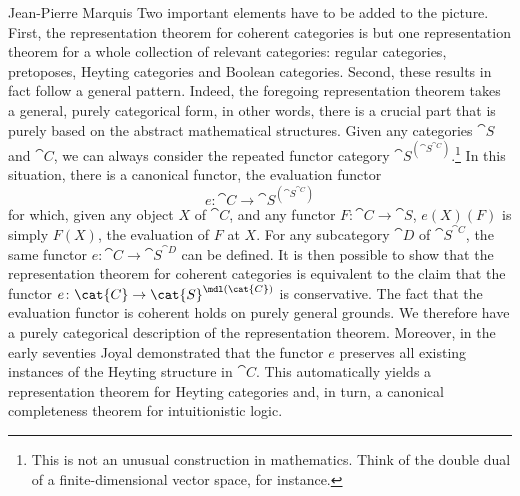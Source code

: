 \begin{artengenv}{Jean-Pierre Marquis}
Two important elements have to be added to the picture. First, the representation theorem for coherent categories is but one representation theorem for a whole collection of relevant categories: regular categories, pretoposes, Heyting categories and Boolean categories. Second, these results in fact follow a general pattern. Indeed, the foregoing representation theorem takes a general, purely categorical form, in other words, there is a crucial part that is purely based on the abstract mathematical structures. Given any categories \( \cat{S} \) and \( \cat{C} \), we can always consider the repeated functor category \( \cat{S}^{(\cat{S}^{\cat{C}})} \).\footnote{This is not an unusual construction in mathematics. Think of the double dual of a finite-dimensional vector space, for instance.} In this situation, there is a canonical functor, the evaluation functor
%
\[
e\colon \cat{C} \rightarrow \cat{S}^{(\cat{S}^{\cat{C}})}
\]
for which, given any object \( X \) of \( \cat{C} \), and any functor \( F\colon \cat{C} \rightarrow \cat{S} \), \( e(X)(F) \) is simply \( F(X) \), the evaluation of \( F \) at \( X \). For any subcategory \( \cat{D} \) of \( \cat{S}^{\cat{C}} \), the same functor \( e\colon \cat{C} \rightarrow \cat{S}^{\cat{D}} \) can be defined. It is then possible to show that the representation theorem for coherent categories is equivalent to the claim that the functor \( e\colon \cat{C} \rightarrow \cat{S}^{\mdl(\cat{C})} \) is conservative. The fact that the evaluation functor is coherent holds on purely general grounds. We therefore have a purely categorical description of the representation theorem. Moreover, in the early seventies Joyal demonstrated that the functor \( e \) preserves all existing instances of the Heyting structure in \( \cat{C} \). This automatically yields a representation theorem for Heyting categories and, in turn, a canonical completeness theorem for intuitionistic logic. 



\end{artengenv}
